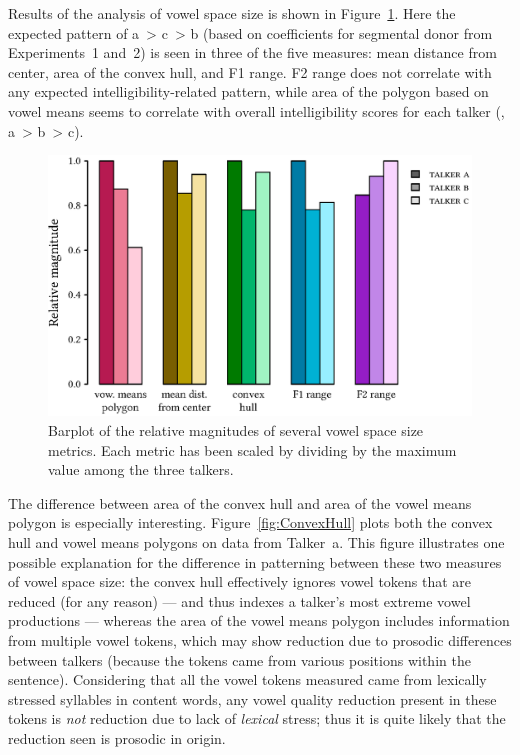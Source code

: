 Results of the \ph{} analysis of vowel space size is shown in Figure~\ref{fig:VowelSpace}.  Here the expected pattern of \ac{a}~> \ac{c}~> \ac{b} (based on coefficients for segmental donor from Experiments~1 and~2) is seen in three of the five measures: mean distance from center, area of the convex hull, and F1 range.  F2 range does not correlate with any expected intelligibility-related pattern, while area of the polygon based on vowel means seems to correlate with overall intelligibility scores for each talker (\ie, \ac{a}~> \ac{b}~> \ac{c}).  

\begin{figure}[bt]
	\begin{centering}
	\includegraphics{figures/posthocs/VowelSpace.eps}
	\caption[Barplot of vowel space size metrics]{Barplot of the relative magnitudes of several vowel space size metrics.  Each metric has been scaled by dividing by the maximum value among the three talkers.\label{fig:VowelSpace}}
	\end{centering}
\end{figure}

The difference between area of the convex hull and area of the vowel means polygon is especially interesting.  Figure~\ref{fig:ConvexHull} plots both the convex hull and vowel means polygons on data from Talker~\ac{a}.  This figure illustrates one possible explanation for the difference in patterning between these two measures of vowel space size: the convex hull effectively ignores vowel tokens that are reduced (for any reason) — and thus indexes a talker’s most extreme vowel productions — whereas the area of the vowel means polygon includes information from multiple vowel tokens, which may show reduction due to prosodic differences between talkers (because the tokens came from various positions within the sentence).  Considering that all the vowel tokens measured came from lexically stressed syllables in content words, any vowel quality reduction present in these tokens is \emph{not} reduction due to lack of \emph{lexical} stress; thus it is quite likely that the reduction seen is prosodic in origin.

